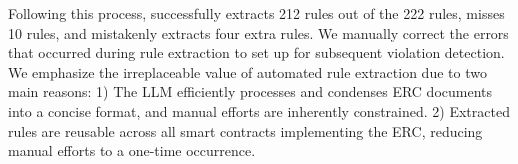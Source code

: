 Following this process, \Tool{} successfully extracts 212 rules out of the 222 rules, misses 10 
rules, and mistakenly extracts four extra rules. 
%
We manually correct the errors that occurred during rule extraction to set up \Tool{} for 
subsequent violation detection. We emphasize the irreplaceable value of automated rule 
extraction due to two main reasons: 1) The LLM efficiently processes and condenses ERC documents 
into a concise format, and manual efforts are inherently constrained. 2) Extracted rules are 
reusable across all smart contracts implementing the ERC, reducing manual efforts to a one-time 
occurrence.


